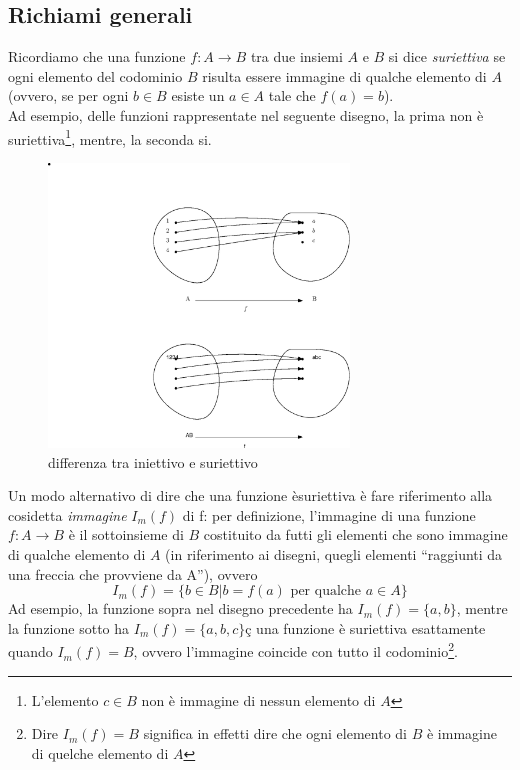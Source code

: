 \documentclass{book}
\begin{document}
\subsection{Richiami generali}
\label{sec:inie_surie_app_lin_ric_gen}
Ricordiamo che una funzione $f:A\to B$ tra due insiemi $A$ e $B$ si dice \textit{suriettiva} se
ogni elemento del codominio $B$ risulta essere immagine di qualche elemento di $A$ (ovvero, se
per ogni $b\in B$ esiste un $a\in A$ tale che $f(a)=b$).\\
Ad esempio, delle funzioni rappresentate nel seguente disegno, la prima non è
suriettiva\footnote{L'elemento $c\in B$ non è immagine di nessun elemento di $A$},
mentre, la seconda si.
\begin{figure}[th]
  \centering
  \includegraphics[width=8cm]{img/finiti/imgex4-4-1.eps}
  \caption{differenza tra iniettivo e suriettivo}
\end{figure}
Un modo alternativo di dire che una funzione èsuriettiva è fare riferimento alla cosidetta 
\textit{immagine} $I_m(f)$ di f: per definizione, l'immagine di una funzione $f:A\to B$ è il
sottoinsieme di $B$ costituito da futti gli elementi che sono immagine di qualche elemento di $A$
(in riferimento ai disegni, quegli elementi ``raggiunti da una freccia che provviene da A''),
ovvero
\begin{equation*}
  I_m(f)=\{b\in B | b=f(a) \text{ per qualche } a \in A\}
\end{equation*}
Ad esempio, la funzione sopra nel disegno precedente ha $I_m(f)=\{a,b\}$, mentre la funzione
sotto ha $I_m(f)=\{a,b,c\}$ç una funzione è suriettiva esattamente quando $I_m(f)=B$, ovvero
l'immagine coincide con tutto il codominio\footnote{Dire $I_m(f)=B$ significa in effetti dire
  che ogni elemento di $B$ è immagine di quelche elemento di $A$}.
\end{document}
